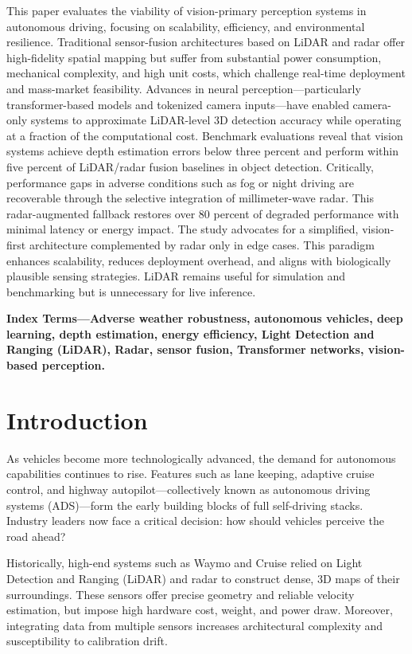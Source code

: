 \documentclass[12pt]{article}
\begin{document}
This paper evaluates the viability of vision-primary perception systems in autonomous driving, focusing on scalability, efficiency, and environmental resilience. Traditional sensor-fusion architectures based on LiDAR and radar offer high-fidelity spatial mapping but suffer from substantial power consumption, mechanical complexity, and high unit costs, which challenge real-time deployment and mass-market feasibility. Advances in neural perception—particularly transformer-based models and tokenized camera inputs—have enabled camera-only systems to approximate LiDAR-level 3D detection accuracy while operating at a fraction of the computational cost. Benchmark evaluations reveal that vision systems achieve depth estimation errors below three percent and perform within five percent of LiDAR/radar fusion baselines in object detection. Critically, performance gaps in adverse conditions such as fog or night driving are recoverable through the selective integration of millimeter-wave radar. This radar-augmented fallback restores over 80 percent of degraded performance with minimal latency or energy impact. The study advocates for a simplified, vision-first architecture complemented by radar only in edge cases. This paradigm enhances scalability, reduces deployment overhead, and aligns with biologically plausible sensing strategies. LiDAR remains useful for simulation and benchmarking but is unnecessary for live inference.

\textbf{Index Terms—Adverse weather robustness, autonomous vehicles, deep
	learning, depth estimation, energy efficiency, Light Detection and Ranging
(LiDAR), Radar, sensor fusion, Transformer networks, vision-based perception.}
\newpage

\section{Introduction}

As vehicles become more technologically advanced, the demand for autonomous
capabilities continues to rise. Features such as lane keeping, adaptive cruise
control, and highway autopilot—collectively known as autonomous driving systems (ADS)—form the early building blocks of full self-driving stacks. Industry leaders now face a critical decision: how should vehicles perceive the road ahead?

Historically, high-end systems such as Waymo and Cruise relied on Light Detection and Ranging (LiDAR) and radar to construct dense, 3D maps of their surroundings. These sensors offer precise geometry and reliable velocity estimation, but impose high hardware cost, weight, and power draw. Moreover, integrating data from multiple sensors increases architectural complexity and susceptibility to calibration drift.
\end{document}
